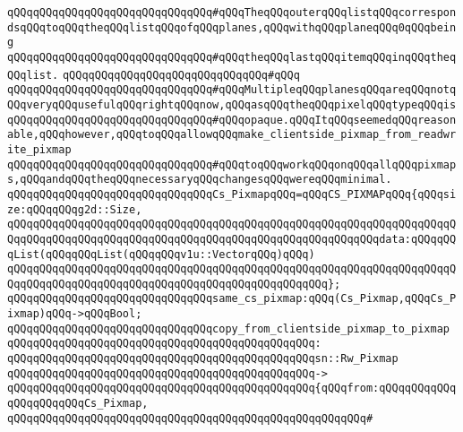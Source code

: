 \verb|qQQqqQQqqQQqqQQqqQQqqQQqqQQqqQQq#qQQqTheqQQqouterqQQqlistqQQqcorrespondsqQQqtoqQQqtheqQQqlistqQQqofqQQqplanes,qQQqwithqQQqplaneqQQq0qQQqbeing|\newline
\verb|qQQqqQQqqQQqqQQqqQQqqQQqqQQqqQQq#qQQqtheqQQqlastqQQqitemqQQqinqQQqtheqQQqlist.|\newline
\verb|qQQqqQQqqQQqqQQqqQQqqQQqqQQqqQQq#qQQq|\newline
\verb|qQQqqQQqqQQqqQQqqQQqqQQqqQQqqQQq#qQQqMultipleqQQqplanesqQQqareqQQqnotqQQqveryqQQqusefulqQQqrightqQQqnow,qQQqasqQQqtheqQQqpixelqQQqtypeqQQqis|\newline
\verb|qQQqqQQqqQQqqQQqqQQqqQQqqQQqqQQq#qQQqopaque.qQQqItqQQqseemedqQQqreasonable,qQQqhowever,qQQqtoqQQqallowqQQqmake_clientside_pixmap_from_readwrite_pixmap|\newline
\verb|qQQqqQQqqQQqqQQqqQQqqQQqqQQqqQQq#qQQqtoqQQqworkqQQqonqQQqallqQQqpixmaps,qQQqandqQQqtheqQQqnecessaryqQQqchangesqQQqwereqQQqminimal.|\newline
\newline
\newline
\verb|qQQqqQQqqQQqqQQqqQQqqQQqqQQqqQQqCs_PixmapqQQq=qQQqCS_PIXMAPqQQq{qQQqsize:qQQqqQQqg2d::Size,|\newline
\verb|qQQqqQQqqQQqqQQqqQQqqQQqqQQqqQQqqQQqqQQqqQQqqQQqqQQqqQQqqQQqqQQqqQQqqQQqqQQqqQQqqQQqqQQqqQQqqQQqqQQqqQQqqQQqqQQqqQQqqQQqqQQqqQQqdata:qQQqqQQqList(qQQqqQQqList(qQQqqQQqv1u::VectorqQQq)qQQq)|\newline
\verb|qQQqqQQqqQQqqQQqqQQqqQQqqQQqqQQqqQQqqQQqqQQqqQQqqQQqqQQqqQQqqQQqqQQqqQQqqQQqqQQqqQQqqQQqqQQqqQQqqQQqqQQqqQQqqQQqqQQqqQQq};|\newline
\newline
\verb|qQQqqQQqqQQqqQQqqQQqqQQqqQQqqQQqsame_cs_pixmap:qQQq(Cs_Pixmap,qQQqCs_Pixmap)qQQq->qQQqBool;|\newline
\newline
\verb|qQQqqQQqqQQqqQQqqQQqqQQqqQQqqQQqcopy_from_clientside_pixmap_to_pixmap|\newline
\verb|qQQqqQQqqQQqqQQqqQQqqQQqqQQqqQQqqQQqqQQqqQQqqQQq:|\newline
\verb|qQQqqQQqqQQqqQQqqQQqqQQqqQQqqQQqqQQqqQQqqQQqqQQqsn::Rw_Pixmap|\newline
\verb|qQQqqQQqqQQqqQQqqQQqqQQqqQQqqQQqqQQqqQQqqQQqqQQq->|\newline
\verb|qQQqqQQqqQQqqQQqqQQqqQQqqQQqqQQqqQQqqQQqqQQqqQQq{qQQqfrom:qQQqqQQqqQQqqQQqqQQqqQQqCs_Pixmap,|\newline
\verb|qQQqqQQqqQQqqQQqqQQqqQQqqQQqqQQqqQQqqQQqqQQqqQQqqQQqqQQq#|\newline

